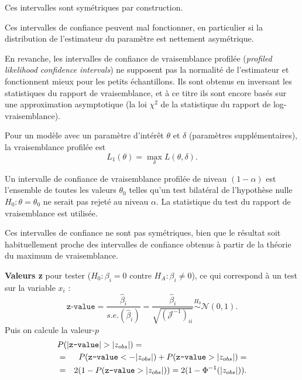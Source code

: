 \documentclass{BeamerTemplate}
\begin{document}
\begin{refsection}
\begin{frame}{}
\bigskip
Ces intervalles sont symétriques par construction.

\bigskip
Ces intervalles de confiance peuvent mal fonctionner, en particulier si la distribution de l'estimateur du paramètre 
est nettement asymétrique. 
\end{frame}


\begin{frame}{}
En revanche, les {\color{blue}intervalles de confiance de vraisemblance profilée} (\textit{profiled likelihood confidence intervals}) ne supposent pas
la normalité de l'estimateur et fonctionnent mieux pour les petits échantillons. Ils sont
obtenus en inversant les statistiques du rapport de vraisemblance, et à ce titre ils sont
encore basés sur une approximation asymptotique (la loi $\chi^2$ de la
statistique du rapport de log-vraisemblance). 

\bigskip
Pour un modèle avec un paramètre d'intérêt $\theta$ et $\delta$ (paramètres supplémentaires),
la vraisemblance profilée est 
$$L_1(\theta) = \max_{\delta} L(\theta,\delta).$$
\end{frame}


\begin{frame}{}
Un intervalle de confiance de vraisemblance profilée de niveau $(1-\alpha)$ est l'ensemble de toutes les valeurs
$\theta_0$ telles qu'un test bilatéral de l'hypothèse nulle $H_0: \theta =
\theta_0$ ne serait pas rejeté au niveau $\alpha$. La statistique du test du rapport de vraisemblance
est utilisée.

\bigskip
Ces intervalles de confiance ne sont pas symétriques, bien que le résultat soit habituellement
proche des intervalles de confiance obtenus à partir de la théorie du maximum de vraisemblance.
\end{frame}


\begin{frame}{}
\textbf{Valeurs z} pour tester ($H_0: \beta_i=0$ contre $H_A: \beta_i \neq
0$), ce qui  correspond à un test sur la variable $x_i$ :
$$\texttt{z-value} = \frac{\hat{\beta}_i}{s.e.(\hat{\beta}_i)} =
\frac{\hat{\beta}_i}{\sqrt{({\mathcal J}^{-1})_{ii}}} \stackrel{H_0}{\sim} {\mathcal
  N}(0,1).$$
Puis on calcule la valeur-$p$
\begin{eqnarray*}
\lefteqn{P(|\texttt{z-value}| > |z_{obs}|) = \hspace*{3cm}}\\
& = & P(\texttt{z-value} < - |z_{obs}|) + P(\texttt{z-value} > |z_{obs}|) =\\
& = & 2 (1-P(\texttt{z-value} > |z_{obs}|)) =2 ( 1 - \Phi^{-1}(|z_{obs}|)).
\end{eqnarray*}


\end{frame}
\end{refsection}
\end{document}
